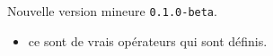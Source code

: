 Nouvelle version mineure \verb+0.1.0-beta+.

\begin{itemize}[itemsep=.5em]
    \item {}
          ce sont de vrais opérateurs qui sont définis.   
\end{itemize}

\separation
